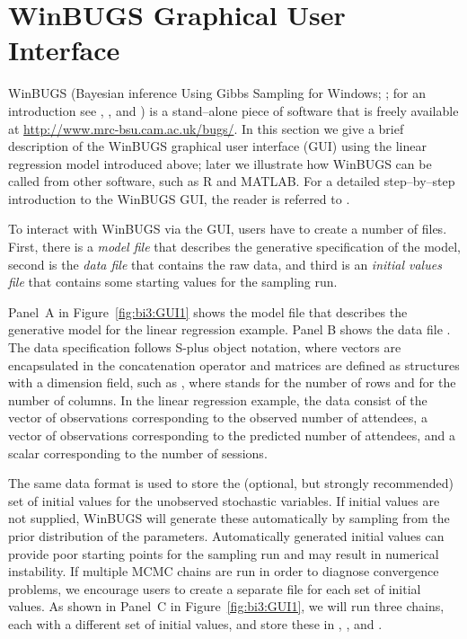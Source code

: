 \section{WinBUGS Graphical User Interface} 

WinBUGS (Bayesian inference Using Gibbs Sampling for Windows; ; for an introduction see , , and ) is a stand--alone piece of software that is freely available at \url{http://www.mrc-bsu.cam.ac.uk/bugs/}. In this section we give a brief description of the WinBUGS graphical user interface (GUI) using the linear regression model introduced above; later we illustrate how WinBUGS can be called from other software, such as R and MATLAB. For a detailed step--by--step introduction to the WinBUGS GUI, the reader is referred to .

To interact with WinBUGS via the GUI, users have to create a number of files. First, there is a \emph{model file} that describes the generative specification of the model, second is the \emph{data file} that contains the raw data, and third is an \emph{initial values file} that contains some starting values for the sampling run.

Panel~A in Figure~\ref{fig:bi3:GUI1} shows the model file  that describes the generative model for the linear regression example. Panel B shows the data file . The data specification follows S-plus object notation, where vectors are encapsulated in the concatenation operator  and matrices are defined as structures with a dimension field, such as , where  stands for the number of rows and  for the number of columns. In the linear regression example, the data consist of the vector of observations  corresponding to the observed number of attendees, a vector of observations  corresponding to the predicted number of attendees, and a scalar  corresponding to the number of sessions.

The same data format is used to store the (optional, but strongly recommended) set of initial values for the unobserved stochastic variables. If initial values are not supplied, WinBUGS will generate these automatically by sampling from the prior distribution of the parameters. Automatically generated initial values can provide poor starting points for the sampling run and may result in numerical instability. If multiple MCMC chains are run in order to diagnose convergence problems, we encourage users to create a separate file for each set of initial values. As shown in Panel~C in Figure~\ref{fig:bi3:GUI1}, we will run three chains, each with a different set of initial values, and store these in , , and . 

